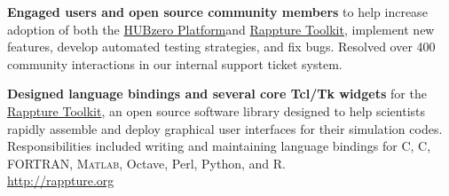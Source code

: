 \documentclass[10pt]{article}
\newcommand{\halfblankline}{\quad\vspace{-0.5\baselineskip}\pagebreak[3]}
\providecommand\Matlab{\textsc{Matlab}}
\newcommand\CC{C\nolinebreak[4]\hspace{-.05em}\raisebox{.4ex}{\relsize{-3}{\textbf{++}}}}
\newcommand\HUBZEROPLATFORM{\href{https://hubzero.org}{HUBzero Platform}}
\newcommand\RAPPTURE{\href{http://rappture.org}{Rappture Toolkit}}
\begin{document}
        \begin{innerlist}

            \item \textbf{Engaged users and open source community members} to help
                increase adoption of both the \HUBZEROPLATFORM \space and \RAPPTURE,
                implement new features, develop automated testing
                strategies, and fix bugs. Resolved over 400 community
                interactions in our internal support ticket system.

            \halfblankline

             \item \textbf{Designed language bindings and several core Tcl/Tk widgets}
                for the \RAPPTURE, an open source software library designed to help
                scientists rapidly assemble and deploy graphical user interfaces for
                their simulation codes. Responsibilities included writing and maintaining
                language bindings for C, \CC, FORTRAN, \Matlab, Octave, Perl, Python,
                and R. \\
                \url{http://rappture.org}


            \halfblankline


\end{innerlist}
\end{document}
